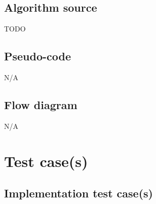 \documentclass[a4paper, oneside, 11pt, article, english]{memoir}
\begin{document}
\section{Algorithm source}
\label{sec:source}

TODO



\section{Pseudo-code}
\label{sec:pseudo}

N/A



\section{Flow diagram}
\label{sec:flowchart}

N/A



\clearpage
\chapter{Test case(s)}
\label{chap:tests}


\section{Implementation test case(s)}
\label{sec:test-implement}
\end{document}
